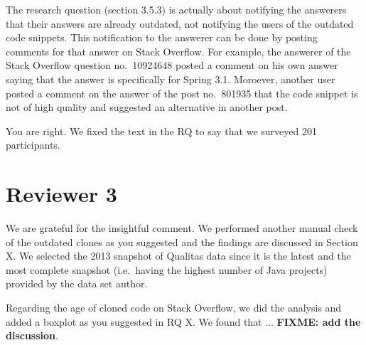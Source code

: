 \documentclass[a4paper,twoside,10pt]{reviewresponse}
\newcommand\FIXME[1]{{\color{red}\textbf{FIXME: #1}}}
\begin{document}
The research question (section 3.5.3) is actually about notifying the answerers that their answers are already outdated, not notifying the users of the outdated code snippets. This notification to the answerer can be done by posting comments for that answer on Stack Overflow. For example, the answerer of the Stack Overflow question no.~10924648 posted a comment on his own answer saying that the answer is specifically for Spring 3.1. Moroever, another user posted a comment on the answer of the post no.~801935 that the code snippet is not of high quality and suggested an alternative in another post.


You are right. We fixed the text in the RQ to say that we surveyed 201 participants.

\section{Reviewer 3}


We are grateful for the insightful comment. We performed another manual check of the outdated clones as you suggested and the findings are discussed in Section X. We selected the 2013 snapshot of Qualitas data since it is the latest and the most complete snapshot (i.e.~having the highest number of Java projects) provided by the data set author. 

Regarding the age of cloned code on Stack Overflow, we did the analysis and added a boxplot as you suggested in RQ X. We found that ... \FIXME{add the discussion}.
\end{document}
